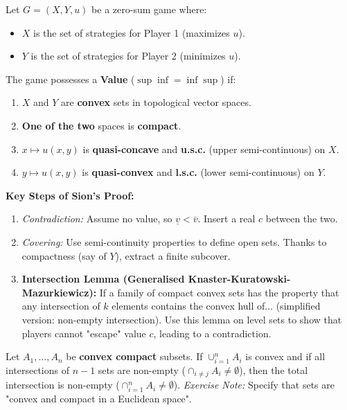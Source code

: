 \documentclass[10pt,a4paper]{article}
\begin{document}
\begin{tcolorbox}[colback=mygreen!5,colframe=mygreen,title=Sion's Theorem (Existence of a Value)]
Let $G = (X, Y, u)$ be a zero-sum game where:
\begin{itemize}
    \item $X$ is the set of strategies for Player 1 (maximizes $u$).
    \item $Y$ is the set of strategies for Player 2 (minimizes $u$).
\end{itemize}
The game possesses a \textbf{Value} ($\sup \inf = \inf \sup$) if:
\begin{enumerate}
    \item $X$ and $Y$ are \textbf{convex} sets in topological vector spaces.
    \item \textbf{One of the two} spaces is \textbf{compact}.
    \item $x \mapsto u(x,y)$ is \textbf{quasi-concave} and \textbf{u.s.c.} (upper semi-continuous) on $X$.
    \item $y \mapsto u(x,y)$ is \textbf{quasi-convex} and \textbf{l.s.c.} (lower semi-continuous) on $Y$.
\end{enumerate}
\end{tcolorbox}

\textbf{Key Steps of Sion's Proof:}
\begin{enumerate}
    \item \textit{Contradiction:} Assume no value, so $\underline{v} < \bar{v}$. Insert a real $c$ between the two.
    \item \textit{Covering:} Use semi-continuity properties to define open sets. Thanks to compactness (say of $Y$), extract a finite subcover.
    \item \textbf{Intersection Lemma (Generalised Knaster-Kuratowski-Mazurkiewicz):}
    If a family of compact convex sets has the property that any intersection of $k$ elements contains the convex hull of... (simplified version: non-empty intersection).
    Use this lemma on level sets to show that players cannot "escape" value $c$, leading to a contradiction.
\end{enumerate}

\begin{tcolorbox}[colback=white,colframe=black,title=Intersection Lemma (Key to Sion)]
Let $A_1, \dots, A_n$ be \textbf{convex compact} subsets. If $\cup_{i=1}^n A_i$ is convex and if all intersections of $n-1$ sets are non-empty ($\cap_{i \neq j} A_i \neq \emptyset$), then the total intersection is non-empty ($\cap_{i=1}^n A_i \neq \emptyset$).
\textit{Exercise Note:} Specify that sets are "convex and compact in a Euclidean space".
\end{tcolorbox}
\end{document}
